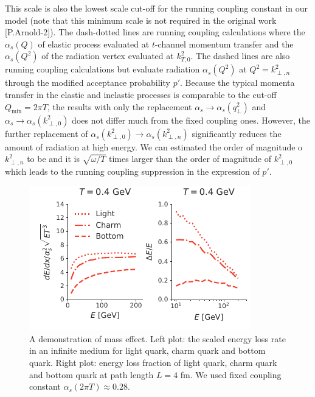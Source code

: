 \documentclass[aps, prc, reprint, amsmath, groupedaddress, nofootinbib]{revtex4-1}
\begin{document}
This scale is also the lowest scale cut-off for the running coupling constant in our model (note that this minimum scale is not required in the original work [P.Arnold-2]).
The dash-dotted lines are running coupling calculations where the $\alpha_s(Q)$ of elastic process evaluated at $t$-channel momentum transfer and the $\alpha_s(Q^2)$ of the radiation vertex evaluated at $k_{T,0}^2$.
The dashed lines are also running coupling calculations but evaluate radiation $\alpha_s(Q^2)$ at $Q^2 = k_{\perp,n}^2$ through the modified acceptance probability $p'$.
Because the typical momenta transfer in the elastic and inelastic processes is comparable to the cut-off $Q_{\min} = 2\pi T$, the results with only the replacement $\alpha_s\rightarrow\alpha_s(q_\perp^2)$ and $\alpha_s\rightarrow\alpha_s(k_{\perp,0}^2)$ does not differ much from the fixed coupling ones.
However, the further replacement of $\alpha_s(k_{\perp,0}^2)\rightarrow\alpha_s(k_{\perp,n}^2)$ significantly reduces the amount of radiation at high energy.
We can estimated the order of magnitude o $k_{\perp,n}^2$ to be  and it is $\sqrt{\omega/T}$ times larger than the order of magnitude of $k_{\perp,0}^2$ which leads to the running coupling suppression in the expression of $p'$.

\begin{figure}
\includegraphics[width=\columnwidth]{Eloss_mass.pdf}
\caption{A demonstration of mass effect. Left plot: the scaled energy loss rate in an infinite medium for light quark, charm quark and bottom quark. Right plot: energy loss fraction of light quark, charm quark and bottom quark at path length $L=4$ fm. We used fixed coupling constant $\alpha_s(2\pi T) \approx 0.28$. }
\label{fig:mass}
\end{figure}
\end{document}

